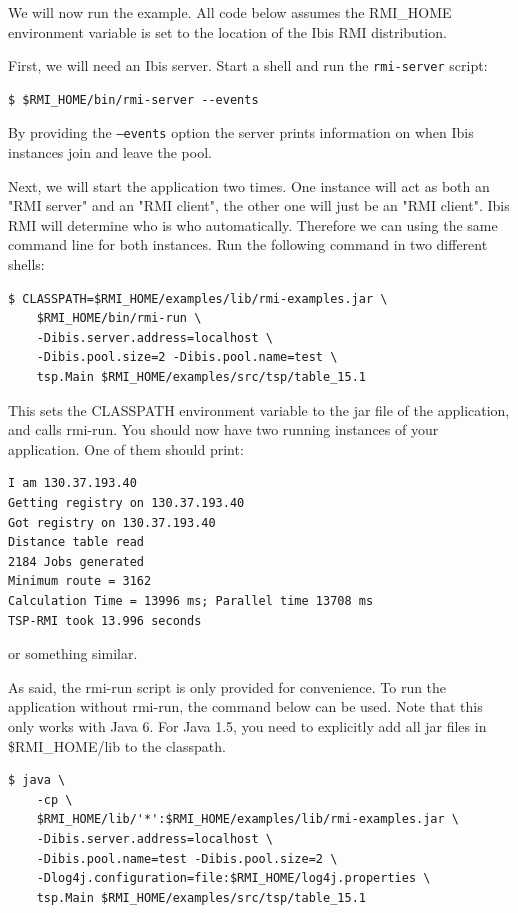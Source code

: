 \documentclass[a4paper,10pt]{article}
\begin{document}
We will now run the example. All code below assumes the RMI\_HOME
environment variable is set to the location of the Ibis RMI distribution.

First, we will need an Ibis server. Start a shell and
run the \texttt{rmi-server} script:
\noindent
{\small
\begin{verbatim}
$ $RMI_HOME/bin/rmi-server --events
\end{verbatim}
}
\noindent

By providing the \texttt{--events} option the server
prints information on when Ibis instances join and leave the pool.

Next, we will start the application two times. One instance will act as both
an "RMI server" and an "RMI client", the other one will just be an "RMI client".
Ibis RMI will determine who is who automatically. Therefore we can using the
same command line for both instances.
Run the following command in two different shells:

\noindent
{\small
\begin{verbatim}
$ CLASSPATH=$RMI_HOME/examples/lib/rmi-examples.jar \
    $RMI_HOME/bin/rmi-run \
    -Dibis.server.address=localhost \
    -Dibis.pool.size=2 -Dibis.pool.name=test \
    tsp.Main $RMI_HOME/examples/src/tsp/table_15.1
\end{verbatim}
}
\noindent

This sets the CLASSPATH environment variable to the jar file of the
application, and calls rmi-run. You should now have two running
instances of your application. One of them should print:

\noindent
{\small
\begin{verbatim}
I am 130.37.193.40
Getting registry on 130.37.193.40
Got registry on 130.37.193.40
Distance table read
2184 Jobs generated
Minimum route = 3162
Calculation Time = 13996 ms; Parallel time 13708 ms
TSP-RMI took 13.996 seconds
\end{verbatim}
}
\noindent

or something similar.

As said, the rmi-run script is only provided for convenience. To run
the application without rmi-run, the command below can be used.
Note that this only works with Java 6. For Java 1.5, you need to
explicitly add all jar files in \$RMI\_HOME/lib to the classpath.

\noindent
{\small
\begin{verbatim}
$ java \
    -cp \
    $RMI_HOME/lib/'*':$RMI_HOME/examples/lib/rmi-examples.jar \
    -Dibis.server.address=localhost \
    -Dibis.pool.name=test -Dibis.pool.size=2 \
    -Dlog4j.configuration=file:$RMI_HOME/log4j.properties \
    tsp.Main $RMI_HOME/examples/src/tsp/table_15.1
\end{verbatim}
}
\noindent
\end{document}
